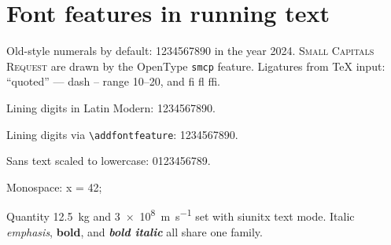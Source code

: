\documentclass[11pt]{article}
\begin{document}
\section*{Font features in running text}
Old-style numerals by default: 1234567890 in the year 2024.
\textsc{Small Capitals Request} are drawn by the OpenType \texttt{smcp} feature.
Ligatures from TeX input: ``quoted'' --- dash -- range 10--20, and fi fl ffi.

{\lmfont Lining digits in Latin Modern: 1234567890.\par}
{Lining digits via \texttt{\textbackslash addfontfeature}: 1234567890.\par}
{\sffamily Sans text scaled to lowercase: 0123456789.\par}
{\ttfamily Monospace: x = 42;\par}
Quantity \qty{12.5}{\kilo\gram} and \SI{3e8}{\meter\per\second} set with siunitx text mode.
Italic \emph{emphasis}, \textbf{bold}, and \textbf{\emph{bold italic}} all share one family.
\end{document}
